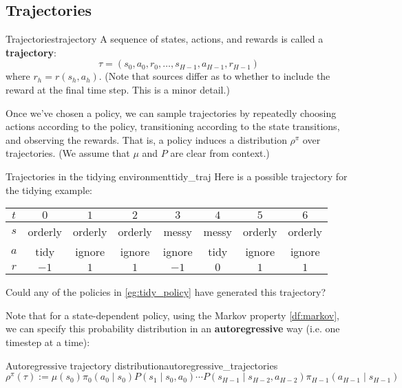 \documentclass[\main/main]{subfiles}
\begin{document}
\subsection{Trajectories}

\begin{definition}{Trajectories}{trajectory}
A sequence of states, actions, and rewards is called a \textbf{trajectory}:
\[
    \tau = (s_0, a_0, r_0, \dots, s_{H-1}, a_{H-1}, r_{H-1})
\]
where $r_h = r(s_h, a_h)$. (Note that sources differ as to whether to include the reward at the final time step. This is a minor detail.)
\end{definition}

Once we've chosen a policy, we can sample trajectories by repeatedly choosing actions according to the policy, transitioning according to the state transitions, and observing the rewards. That is, a policy induces a distribution $\rho^{\pi}$ over trajectories. (We assume that $\mu$ and $P$ are clear from context.)

\begin{example}{Trajectories in the tidying environment}{tidy_traj}
    Here is a possible trajectory for the tidying example:

    \begin{center}
    \begin{tabular}{cccccccc}
        $t$ & $0$ & $1$ & $2$ & $3$ & $4$ & $5$ & $6$ \\
        \hline
        $s$ & orderly & orderly & orderly & messy & messy & orderly & orderly \\
        $a$ & tidy & ignore & ignore & ignore & tidy & ignore & ignore \\
        $r$ & $-1$ & $1$ & $1$ & $-1$ & $0$ & $1$ & $1$
    \end{tabular}
    \end{center}

    Could any of the policies in \ref{eg:tidy_policy} have generated this trajectory?
\end{example}

Note that for a state-dependent policy, using the Markov property \eqref{df:markov}, we can specify this probability distribution in an \textbf{autoregressive} way (i.e. one timestep at a time):

\begin{definition}{Autoregressive trajectory distribution}{autoregressive_trajectories}
    \[
        \rho^{\pi}(\tau) := \mu(s_0) \pi_0(a_0 \mid s_0) P(s_1 \mid s_0, a_0) \cdots P(s_{H-1} \mid s_{H-2}, a_{H-2}) \pi_{H-1}(a_{H-1} \mid s_{H-1})
    \]
\end{definition}
\end{document}
